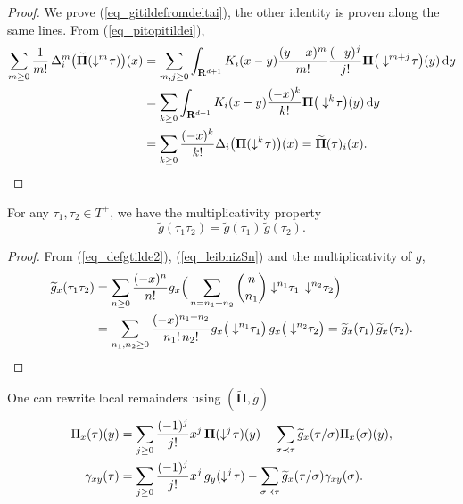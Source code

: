 \documentclass[11pt]{preprint}
\def\PPi{\boldsymbol{\Pi}}
\def\eqref#1{(\ref{#1})}
\newcommand{\bfR}{\mathbf{R}}
\newcommand{\ddd}{ \text{d} }
\begin{document}
	\begin{proof}
		We prove \eqref{eq_gitildefromdeltai}, the other identity is proven along the same lines. From \eqref{eq_pitopitildei},
		\begin{align*}
			\sum_{m\geq 0} \frac{1}{m!} \, \Delta_i^m\big(\widetilde{ \PPi}(\downarrow^m\hspace{-2pt}\tau)\big)(x) 
			&=
			\sum_{m,j\geq 0}\int_{\bfR^{d+1}} K_i(x-y) \frac{(y-x)^m}{m!} \frac{(-y)^j}{j!} { \PPi}\big(\downarrow^{m+j}\hspace{-2pt}\tau\big)(y) \, \ddd y
			\\   
			&=
			\sum_{k\geq 0} \int_{\bfR^{d+1}}  K_i(x-y) \frac{(-x)^k}{k!} {\PPi}\big( \downarrow^k\hspace{-2pt}\tau\big)(y) \, \ddd y
			\\
			&= \sum_{k\geq 0} \frac{(-x)^k}{k!} \Delta_i\big({\PPi}(\downarrow^k\hspace{-2pt}\tau)\big)(x)
			=
			\widetilde{\PPi}(\tau)_i(x).
		\end{align*}
	\end{proof}
		\begin{lemma}\label{lem_multiplicativitygtilde}
		For any $\tau_1,\tau_2\in T^+$, we have the multiplicativity property
		$$
		\widetilde{ g}(\tau_1\tau_2) = \widetilde{ g}(\tau_1)\, \widetilde{ g}(\tau_2).
		$$
	\end{lemma}
	\begin{proof}
		From \eqref{eq_defgtilde2}, \eqref{eq_leibnizSn} and the multiplicativity of ${ g}$,
		\begin{align*}
			\widetilde{ g}_x(\tau_1\tau_2) &= \sum_{n\geq 0} \frac{(-x)^n}{n!} { g}_x\Big( \sum_{n=n_1+n_2}\binom{n}{n_1} \downarrow^{n_1}\hspace{-3pt}\tau_1 \,  \downarrow^{n_2}\hspace{-3pt}\tau_2\Big)
			\\
			&= \sum_{n_1,n_2\geq 0} \frac{(-x)^{n_1+n_2}}{n_1! \, n_2!} { g}_x\big(\downarrow^{n_1}\hspace{-3pt}\tau_1\big) \, { g}_x\big(\downarrow^{n_2}\hspace{-3pt}\tau_2\big)
			=\widetilde{ g}_x(\tau_1)\, \widetilde{ g}_x(\tau_2).
		\end{align*} 
	\end{proof}
	One can rewrite local remainders using ${ (\widetilde{\PPi},\widetilde{g})}$
	\begin{equation}
		\begin{aligned}
		{ \Pi}_{x}(\tau)(y) &= \sum_{j\geq 0}\frac{(-1)^j}{j!}x^j \, { \PPi}(\downarrow^j\hspace{-2pt} \tau)(y) -\sum_{\sigma \prec \tau} \widetilde{ g}_x(\tau/\sigma) { \Pi}_{x}(\sigma)(y),
\\
		{ \gamma}_{xy}(\tau) &= \sum_{j\geq 0}\frac{(-1)^j}{j!}x^j \, { g}_y(\downarrow^j\hspace{-2pt} \tau) -\sum_{\sigma \prec \tau} \widetilde{ g}_x(\tau/\sigma) { \gamma}_{xy}(\sigma).
		\end{aligned}
	\end{equation}
\end{document}
